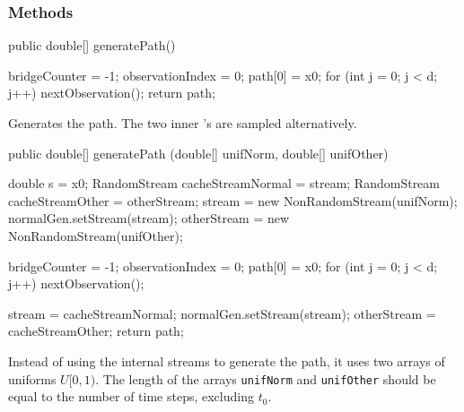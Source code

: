 \subsubsection* {Methods}
\begin{code}

   public double[] generatePath() \begin{hide} {
        bridgeCounter    = -1;
        observationIndex =  0;
        path[0]          = x0;
        for (int j = 0; j < d; j++)   nextObservation();
        return path;
    }\end{hide}
\end{code}
\begin{tabb} Generates the path.  The two inner 
's
are sampled alternatively.
\end{tabb}
\begin{code}

   public double[] generatePath (double[] unifNorm, double[] unifOther) \begin{hide} {
        double s = x0;
        RandomStream cacheStreamNormal = stream;
        RandomStream cacheStreamOther  = otherStream;
        stream = new NonRandomStream(unifNorm);
        normalGen.setStream(stream);
        otherStream = new NonRandomStream(unifOther);

        bridgeCounter    = -1;
        observationIndex =  0;
        path[0]          = x0;
        for (int j = 0; j < d; j++)   nextObservation();

        stream = cacheStreamNormal;
        normalGen.setStream(stream);
        otherStream = cacheStreamOther;
        return path;
    }\end{hide}
\end{code}
\begin{tabb}
Instead of using the internal streams to generate the path,
it uses two arrays of uniforms $U[0,1)$.  The length of the arrays \texttt{unifNorm} 
 and \texttt{unifOther} should be equal to the number of time steps, excluding $t_0$.
\end{tabb}
